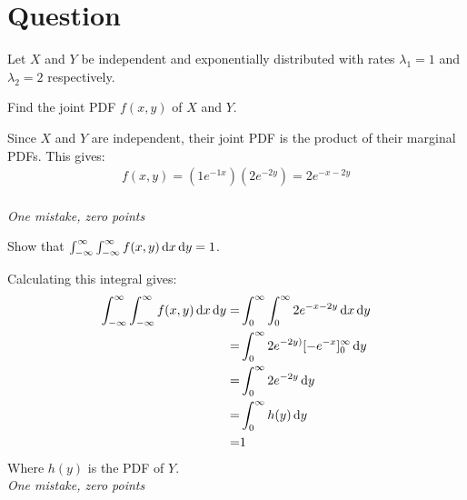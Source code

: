 \section{Question}

Let $X$ and $Y$ be independent and exponentially distributed with rates $\lambda_1 = 1$ and $\lambda_2 = 2$ respectively.
\begin{exercise}[0.5]
Find the joint PDF $f(x,y)$ of $X$ and $Y$.
\begin{solution}
    Since $X$ and $Y$ are independent, their joint PDF is the product of their marginal PDFs. This gives:
    \begin{align*}
        f(x,y) = (1e^{-1x})(2e^{-2y}) = 2e^{-x-2y}
    \end{align*} \\
    \textit{One mistake, zero points}
\end{solution}
\end{exercise}

\begin{exercise}[0.5]
Show that $\int_{-\infty}^\infty \int_{-\infty}^\infty f(x,y) \,\textrm{d}x \,\textrm{d}y = 1$.
\begin{solution}
    Calculating this integral gives:
    \begin{align*}
      \int_{-\infty}^\infty \int_{-\infty}^\infty f(x,y) \,\textrm{d}x \,\textrm{d}y =& \int_0^\infty \int_0^\infty 2e^{-x-2y} \,\textrm{d}x \,\textrm{d}y \\
      =& \int_0^\infty 2e^{-2y)}[-e^{-x}]_0^\infty \,\textrm{d}y \\
      =& \int_0^\infty 2e^{-2y} \,\textrm{d}y \\
      =& \int_0^\infty h(y) \,\textrm{d}y \\
      =& 1
    \end{align*}
    Where $h(y)$ is the PDF of $Y$. \\
    \textit{One mistake, zero points}
\end{solution}
\end{exercise}

